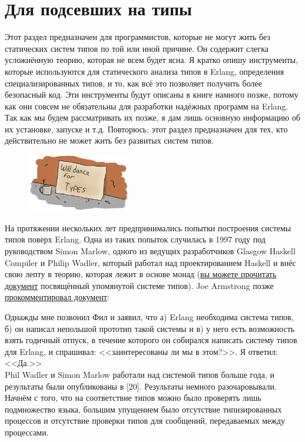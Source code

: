 \documentclass[a4paper,12pt]{report}
\begin{document}
\section{Для подсевших на типы}
Этот раздел предназначен для программистов, которые не могут жить без статических систем типов по той или иной причине. Он содержит слегка усложнённую теорию, которая не всем будет ясна. Я кратко опишу инструменты, которые используются для статического анализа типов в Erlang, определения специализированных типов, и то, как всё это позволяет получить более безопасный код. Эти инструменты будут описаны в книге намного позже, потому как они совсем не обязательны для разработки надёжных программ на Erlang. Так как мы будем рассматривать их позже, я дам лишь основную информацию об их установке, запуске и т.д. Повторюсь: этот раздел предназначен для тех, кто действительно не может жить без развитых систем типов.
\begin{figure}[h!]
    \includegraphics[width=0.4\textwidth]{type-dance.png}
\end{figure} 

На протяжении нескольких лет предпринимались попытки построения системы типов поверх Erlang. Одна из таких попыток случилась в 1997 году под руководством Simon Marlow, одного из ведущих разработчиков Glasgow Haskell Compiler и Philip Wadler, который работал над проектированием Haskell и внёс свою лепту в теорию, которая лежит в основе монад (\href{http://www.haskell.org/~simonmar/papers/erltc.pdf}{вы можете прочитать документ} посвящённый упомянутой системе типов). Joe Armstrong позже \href{http://www.cs.chalmers.se/Cs/Grundutb/Kurser/ppxt/HT2007/general/languages/armstrong-erlang\_history.pdf}{прокомментировал документ}:\\
\colorbox{lgray}
{
    \begin{minipage}{\linewidth}
Однажды мне позвонил Фил и заявил, что а) Erlang необходима система типов, б) он написал непольшой прототип такой системы и в) у него есть возможность взять годичный отпуск, в течение которого он собирался написать систему типов для Erlang, и спрашивал: <<заинтересованы ли мы в этом?>>. Я ответил: <<Да.>>\\
Phil Wadler и Simon Marlow работали над системой типов больше года, и результаты были опубликованы в [20]. Результаты немного разочаровывали. Начнём с того, что на соответствие типов можно было проверять лишь подмножество языка, большим упущением было отсутствие типизированных процессов и отсутствие проверки типов для сообщений, передаваемых между процессами.
    \end{minipage}
}
\end{document}
